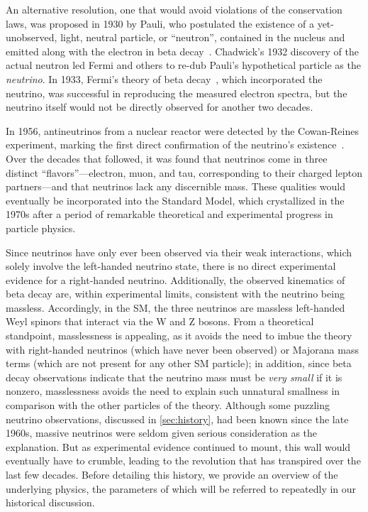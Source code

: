 \documentclass[../thesis.tex]{subfiles}
\begin{document}
An alternative resolution, one that would avoid violations of the conservation laws, was proposed in 1930 by Pauli, who postulated the existence of a yet-unobserved, light, neutral particle, or ``neutron'', contained in the nucleus and emitted along with the electron in beta decay~\cite{Pauli:83282}. Chadwick's 1932 discovery of the actual neutron led Fermi and others to re-dub Pauli's hypothetical particle as the \emph{neutrino}. In 1933, Fermi's theory of beta decay~\cite{Fermi1934TentativoDU}, which incorporated the neutrino, was successful in reproducing the measured electron spectra, but the neutrino itself would not be directly observed for another two decades.

In 1956, antineutrinos from a nuclear reactor were detected by the Cowan-Reines experiment, marking the first direct confirmation of the neutrino's existence~\cite{Cowan103}. Over the decades that followed, it was found that neutrinos come in three distinct ``flavors''---electron, muon, and tau, corresponding to their charged lepton partners---and that neutrinos lack any discernible mass. These qualities would eventually be incorporated into the Standard Model, which crystallized in the 1970s after a period of remarkable theoretical and experimental progress in particle physics.

Since neutrinos have only ever been observed via their weak interactions, which solely involve the left-handed neutrino state, there is no direct experimental evidence for a right-handed neutrino. Additionally, the observed kinematics of beta decay are, within experimental limits, consistent with the neutrino being massless. Accordingly, in the SM, the three neutrinos are massless left-handed Weyl spinors that interact via the W and Z bosons. From a theoretical standpoint, masslessness is appealing, as it avoids the need to imbue the theory with right-handed neutrinos (which have never been observed) or Majorana mass terms (which are not present for any other SM particle); in addition, since beta decay observations indicate that the neutrino mass must be \emph{very small} if it is nonzero, masslessness avoids the need to explain such unnatural smallness in comparison with the other particles of the theory. Although some puzzling neutrino observations, discussed in \autoref{sec:history}, had been known since the late 1960s, massive neutrinos were seldom given serious consideration as the explanation. But as experimental evidence continued to mount, this wall would eventually have to crumble, leading to the revolution that has transpired over the last few decades. Before detailing this history, we provide an overview of the underlying physics, the parameters of which will be referred to repeatedly in our historical discussion.
\end{document}
